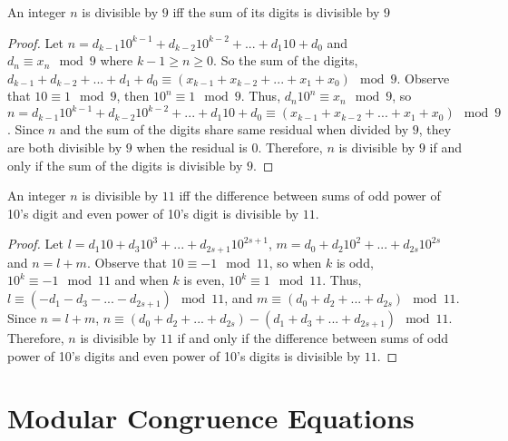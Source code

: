 \begin{theorem}
An integer $n$ is divisible by $9$ iff the sum of its digits is divisible by $9$
\end{theorem}

\begin{proof}
Let $n = d_{k-1}10^{k-1} + d_{k-2}10^{k-2} + ... + d_{1}10 + d_{0}$ and\\ $d_n \equiv x_n \mod9$ where $k-1 \geq n \geq 0$. So the sum of the digits, $d_{k-1} + d_{k-2}+ ... + d_{1}+ d_{0} \equiv (x_{k-1} + x_{k-2} + ... + x_1 + x_0) \mod 9$. Observe that $10 \equiv 1 \mod 9$, then $10^n \equiv 1 \mod 9$. Thus, $d_n10^n \equiv x_n \mod9$, so $n = d_{k-1}10^{k-1} + d_{k-2}10^{k-2} + ... + d_{1}10 + d_{0} \equiv (x_{k-1} + x_{k-2} + ... + x_1 + x_0) \mod 9$. Since $n$ and the sum of the digits share same residual when divided by $9$, they are both divisible by $9$ when the residual is $0$. Therefore, $n$ is divisible by $9$ if and only if the sum of the digits is divisible by $9$.
\end{proof}

\begin{theorem}
An integer $n$ is divisible by $11$ iff the difference between sums of odd power of 10's digit and even power of 10's digit is divisible by $11$.
\end{theorem}

\begin{proof}
Let $l = d_{1}10 + d_{3}10^3 + ... + d_{2s+1}10^{2s+1}$, $m = d_{0} + d_{2}10^2 + ... + d_{2s}10^{2s}$ and $n = l+m$. Observe that $10 \equiv -1 \mod 11$, so when $k$ is odd, $10^k \equiv -1 \mod 11$ and when $k$ is even, $10^k \equiv 1 \mod 11$. Thus, $l \equiv (-d_{1}-d_{3}-...-d_{2s+1}) \mod 11$, and $m \equiv (d_{0}+d_{2}+...+d_{2s}) \mod 11$. Since $n = l+m$, $n \equiv (d_{0}+d_{2}+...+d_{2s}) - (d_{1}+d_{3}+...+d_{2s+1}) \mod 11$. Therefore, $n$ is divisible by $11$ if and only if the difference between sums of odd power of 10's digits and even power of 10's digits is divisible by $11$.
\end{proof}
\section{Modular Congruence Equations}

